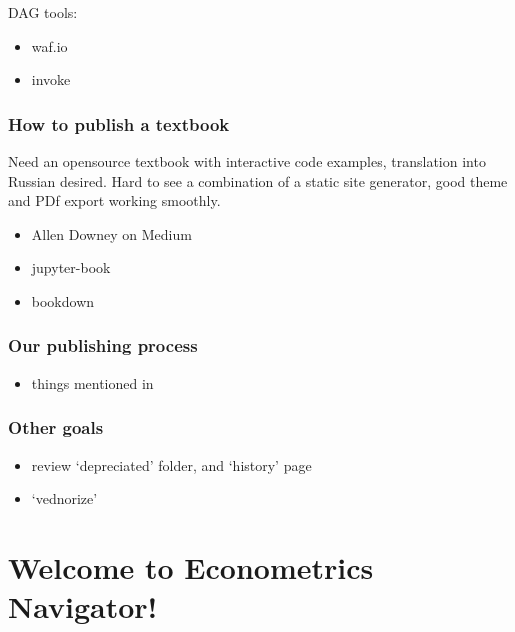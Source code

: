 \documentclass[letterpaper,10pt,english]{sphinxmanual}
\begin{document}
DAG tools:
\begin{itemize}
\item {} 
waf.io

\item {} 
invoke

\end{itemize}


\subsection{How to publish a textbook}
\label{\detokenize{roadmap:how-to-publish-a-textbook}}
Need an opensource textbook with interactive code examples, translation into Russian desired.
Hard to see a combination of a static site generator, good theme and PDf export working smoothly.
\begin{itemize}
\item {} 
Allen Downey on Medium

\item {} 
jupyter-book

\item {} 
bookdown

\end{itemize}


\subsection{Our publishing process}
\label{\detokenize{roadmap:our-publishing-process}}\begin{itemize}
\item {} 
things mentioned in 

\end{itemize}


\subsection{Other goals}
\label{\detokenize{roadmap:other-goals}}\begin{itemize}
\item {} 
review ‘depreciated’ folder, and ‘history’ page

\item {} 
‘vednorize’ 

\end{itemize}


\chapter{Welcome to Econometrics Navigator!}
\label{\detokenize{index:welcome-to-econometrics-navigator}}
\end{document}
